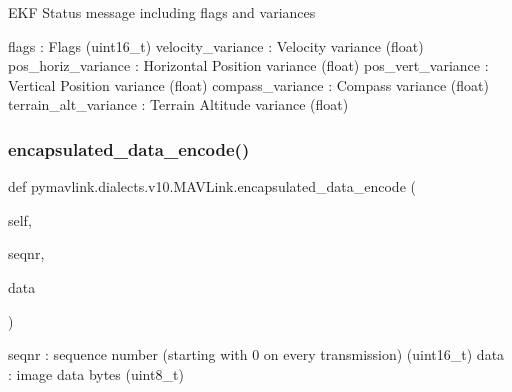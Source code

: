 \begin{DoxyVerb}
\begin{DoxyVerb}
\begin{DoxyVerb}EKF Status message including flags and variances

flags                     : Flags (uint16_t)
velocity_variance         : Velocity variance (float)
pos_horiz_variance        : Horizontal Position variance (float)
pos_vert_variance         : Vertical Position variance (float)
compass_variance          : Compass variance (float)
terrain_alt_variance        : Terrain Altitude variance (float)\end{DoxyVerb}
 \mbox{\label{classpymavlink_1_1dialects_1_1v10_1_1MAVLink_aff22bd7ee21436f88799c514db1c822d}} 
\subsubsection{\texorpdfstring{encapsulated\+\_\+data\+\_\+encode()}{encapsulated\_data\_encode()}}
{\footnotesize\ttfamily def pymavlink.\+dialects.\+v10.\+M\+A\+V\+Link.\+encapsulated\+\_\+data\+\_\+encode (\begin{DoxyParamCaption}\item[{}]{self,  }\item[{}]{seqnr,  }\item[{}]{data }\end{DoxyParamCaption})}

\begin{DoxyVerb}seqnr                     : sequence number (starting with 0 on every transmission) (uint16_t)
data                      : image data bytes (uint8_t)\end{DoxyVerb}
 \mbox{\label{classpymavlink_1_1dialects_1_1v10_1_1MAVLink_a99fe1be361bc1866b03f74dd20065b3f}} 

\end{DoxyVerb}
\end{DoxyVerb}
